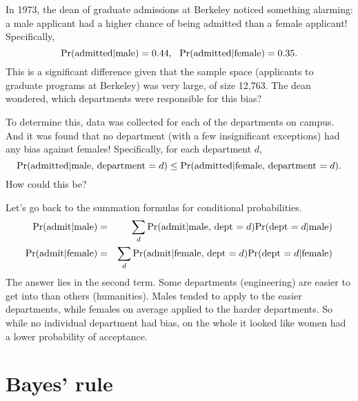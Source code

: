 \documentclass{report}
\theoremstyle{plain}
\theoremstyle{definition}
\newcommand{\pr}{\mbox{\rm Pr}}
\begin{document}
In 1973, the dean of graduate admissions at Berkeley noticed something alarming: a male applicant had a higher chance of being admitted than a female applicant! Specifically, 
$$ \pr(\mbox{admitted} | \mbox{male}) = 0.44, 
\ \  \pr(\mbox{admitted} | \mbox{female}) = 0.35.$$
This is a significant difference given that the sample space (applicants to graduate programs at Berkeley) was very large, of size 12{,}763. The dean wondered, which departments were responsible for this bias?

To determine this, data was collected for each of the departments on campus. And it was found that no department (with a few insignificant exceptions) had any bias against females! Specifically, for each department $d$,
$$ \pr(\mbox{admitted} | \mbox{male, department $=d$}) 
\leq \pr(\mbox{admitted} | \mbox{female, department $=d$}).$$
How could this be?

Let's go back to the summation formulas for conditional probabilities.
\begin{eqnarray*}
\pr(\mbox{admit} | \mbox{male}) 
& = & 
\sum_d \pr(\mbox{admit} | \mbox{male, dept $= d$}) \pr(\mbox{dept $=d$} | \mbox{male}) \\
\pr(\mbox{admit} | \mbox{female}) 
& = & 
\sum_d \pr(\mbox{admit} | \mbox{female, dept $= d$}) \pr(\mbox{dept $=d$} | \mbox{female}) 
\end{eqnarray*}
The answer lies in the second term. Some departments (engineering) are easier to get into than others (humanities). Males tended to apply to the easier departments, while females on average applied to the harder departments. So while no individual department had bias, on the whole it looked like women had a lower probability of acceptance.

\section{Bayes' rule}
\end{document}
